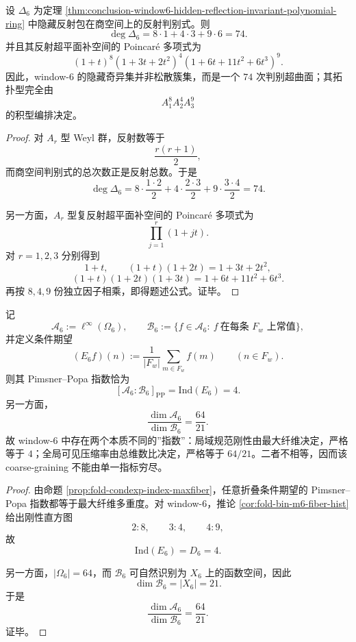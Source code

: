 \begin{corollary}\label{cor:conclusion-window6-reflection-discriminant-degree-poincare}
设 \(\Delta_6\) 为定理 \ref{thm:conclusion-window6-hidden-reflection-invariant-polynomial-ring} 中隐藏反射包在商空间上的反射判别式。则
\[
\deg \Delta_6
=
8\cdot 1+4\cdot 3+9\cdot 6
=
74.
\]
并且其反射超平面补空间的 Poincaré 多项式为
\[
(1+t)^8(1+3t+2t^2)^4(1+6t+11t^2+6t^3)^9.
\]
因此，window-\(6\) 的隐藏奇异集并非松散簇集，而是一个 \(74\) 次判别超曲面；其拓扑型完全由
\[
A_1^8A_2^4A_3^9
\]
的积型编排决定。
\end{corollary}
\begin{proof}
对 \(A_r\) 型 Weyl 群，反射数等于
\[
\frac{r(r+1)}{2},
\]
而商空间判别式的总次数正是反射总数。于是
\[
\deg\Delta_6
=
8\cdot \frac{1\cdot 2}{2}
+4\cdot \frac{2\cdot 3}{2}
+9\cdot \frac{3\cdot 4}{2}
=
74.
\]

另一方面，\(A_r\) 型复反射超平面补空间的 Poincaré 多项式为
\[
\prod_{j=1}^{r}(1+jt).
\]
对 \(r=1,2,3\) 分别得到
\[
1+t,\qquad
(1+t)(1+2t)=1+3t+2t^2,
\]
\[
(1+t)(1+2t)(1+3t)=1+6t+11t^2+6t^3.
\]
再按 \(8,4,9\) 份独立因子相乘，即得题述公式。证毕。
\end{proof}

\begin{theorem}[局域规范指数与全局压缩率的严格分离]\label{thm:conclusion-window6-local-index-global-compression-separation}
记
\[
\mathscr A_6:=\ell^\infty(\Omega_6),
\qquad
\mathscr B_6:=\{f\in \mathscr A_6:\ f\ \text{在每条 }F_w\text{ 上常值}\},
\]
并定义条件期望
\[
(E_6f)(n):=\frac{1}{|F_w|}\sum_{m\in F_w}f(m)
\qquad(n\in F_w).
\]
则其 Pimsner--Popa 指数恰为
\[
[\mathscr A_6:\mathscr B_6]_{\mathrm{PP}}=\mathrm{Ind}(E_6)=4.
\]
另一方面，
\[
\frac{\dim \mathscr A_6}{\dim \mathscr B_6}
=
\frac{64}{21}.
\]
故 window-\(6\) 中存在两个本质不同的”指数”：局域规范刚性由最大纤维决定，严格等于 \(4\)；全局可见压缩率由总维数比决定，严格等于 \(64/21\)。二者不相等，因而该 coarse-graining 不能由单一指标穷尽。
\end{theorem}
\begin{proof}
由命题 \ref{prop:fold-condexp-index-maxfiber}，任意折叠条件期望的 Pimsner--Popa 指数都等于最大纤维多重度。对 window-\(6\)，推论 \ref{cor:fold-bin-m6-fiber-hist} 给出刚性直方图
\[
2:8,\qquad 3:4,\qquad 4:9,
\]
故
\[
\mathrm{Ind}(E_6)=D_6=4.
\]

另一方面，\(|\Omega_6|=64\)，而 \(\mathscr B_6\) 可自然识别为 \(X_6\) 上的函数空间，因此
\[
\dim \mathscr B_6=|X_6|=21.
\]
于是
\[
\frac{\dim \mathscr A_6}{\dim \mathscr B_6}=\frac{64}{21}.
\]
证毕。
\end{proof}

